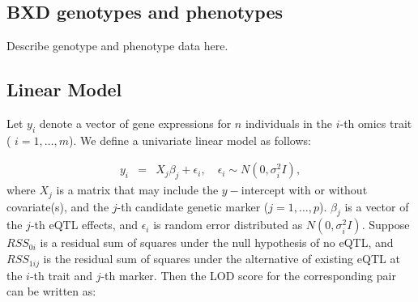 \documentclass[9pt,twocolumn,twoside,lineno]{gsag3jnl}
\begin{document}
\subsection{BXD genotypes and phenotypes}

Describe genotype and phenotype data here.


\subsection{Linear Model} 
 Let $y_i$ denote a vector of gene expressions for $n$
individuals in the $i$-th omics trait ( $i=1,\ldots,m$).  We
define a univariate linear model as follows:

\begin{eqnarray*}
	y_i &=& X_j \beta_j+ \epsilon_i,
	\quad \epsilon_i \sim N(0,\sigma_i^2I),
\end{eqnarray*}
where ${X}_j$ is a matrix that may include the $y-$intercept with
or without covariate(s), and the $j$-th candidate genetic marker
($j=1,\ldots,p$).  ${\beta}_j$ is a vector of the $j$-th eQTL
effects, and ${\epsilon}_i$ is random error distributed as $N(0,\sigma_i^2I)$.  Suppose $RSS_{0i}$
is a residual sum of squares under the null hypothesis of no eQTL, and $RSS_{1ij}$ is the residual sum of squares under the
alternative of existing eQTL at the $i$-th trait and $j$-th marker.  Then the LOD
score for the corresponding pair can be written as:
\end{document}
